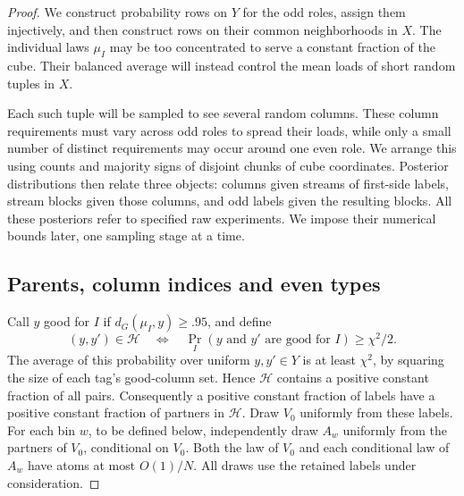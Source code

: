 \begin{proof}
We construct probability rows on \(Y\) for the odd roles, assign them
injectively, and then construct rows on their common neighborhoods in
\(X\). The individual laws \(\mu_I\) may be too concentrated to serve a
constant fraction of the cube. Their balanced average will instead control
the mean loads of short random tuples in \(X\).

Each such tuple will be sampled to see several random columns. These
column requirements must vary across odd roles to spread their loads,
while only a small number of distinct requirements may occur around one
even role. We arrange this using counts and majority signs of disjoint
chunks of cube coordinates. Posterior distributions then relate three
objects: columns given streams of first-side labels, stream blocks given
those columns, and odd labels given the resulting blocks. All these
posteriors refer to specified raw experiments. We impose their numerical
bounds later, one sampling stage at a time.

\subsection{Parents, column indices and even types}
\label{sec:parents-macro-keys-and-even-types}

Call \(y\) good for \(I\) if \(d_G(\mu_I,y)\ge .95\), and define
\[
 (y,y')\in\mathcal H
 \quad\Longleftrightarrow\quad
 \Pr_I(y\text{ and }y'\text{ are good for }I)\ge\chi^2/2.
\]
The average of this probability over uniform \(y,y'\in Y\) is at least
\(\chi^2\), by squaring the size of each tag's good-column set. Hence
\(\mathcal H\) contains a positive constant fraction of all pairs.
Consequently a positive constant fraction of labels have a positive
constant fraction of partners in \(\mathcal H\). Draw \(V_0\) uniformly
from these labels. For each bin \(w\), to be defined below, independently
draw \(A_w\) uniformly from the partners of \(V_0\), conditional on
\(V_0\). Both the law of \(V_0\) and each conditional law of \(A_w\)
have atoms at most \(O(1)/N\). All draws use the retained labels under
consideration.


\end{proof}
